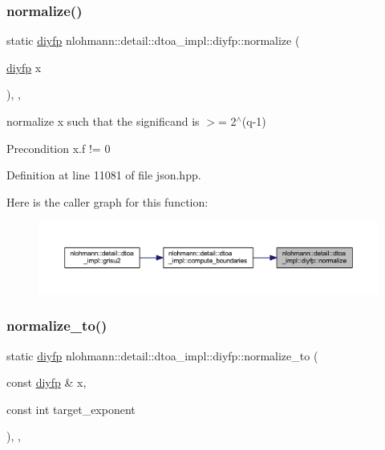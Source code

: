 \subsubsection{\texorpdfstring{normalize()}{normalize()}}
{\footnotesize\ttfamily static \mbox{\hyperlink{structnlohmann_1_1detail_1_1dtoa__impl_1_1diyfp}{diyfp}} nlohmann\+::detail\+::dtoa\+\_\+impl\+::diyfp\+::normalize (\begin{DoxyParamCaption}\item[{\mbox{\hyperlink{structnlohmann_1_1detail_1_1dtoa__impl_1_1diyfp}{diyfp}}}]{x }\end{DoxyParamCaption})\hspace{0.3cm}{\ttfamily [inline]}, {\ttfamily [static]}, {\ttfamily [noexcept]}}



normalize x such that the significand is $>$= 2$^\wedge$(q-\/1) 

\begin{DoxyPrecond}{Precondition}
x.\+f != 0 
\end{DoxyPrecond}


Definition at line 11081 of file json.\+hpp.

Here is the caller graph for this function\+:
\nopagebreak
\begin{figure}[H]
\begin{center}
\leavevmode
\includegraphics[width=350pt]{structnlohmann_1_1detail_1_1dtoa__impl_1_1diyfp_a2246b5b40c7c6992153ef174063d6aa6_icgraph}
\end{center}
\end{figure}
\mbox{\label{structnlohmann_1_1detail_1_1dtoa__impl_1_1diyfp_a6b6665e467ebabe0c0f7418d3fe4b118}} 
\subsubsection{\texorpdfstring{normalize\_to()}{normalize\_to()}}
{\footnotesize\ttfamily static \mbox{\hyperlink{structnlohmann_1_1detail_1_1dtoa__impl_1_1diyfp}{diyfp}} nlohmann\+::detail\+::dtoa\+\_\+impl\+::diyfp\+::normalize\+\_\+to (\begin{DoxyParamCaption}\item[{const \mbox{\hyperlink{structnlohmann_1_1detail_1_1dtoa__impl_1_1diyfp}{diyfp}} \&}]{x,  }\item[{const int}]{target\+\_\+exponent }\end{DoxyParamCaption})\hspace{0.3cm}{\ttfamily [inline]}, {\ttfamily [static]}, {\ttfamily [noexcept]}}



